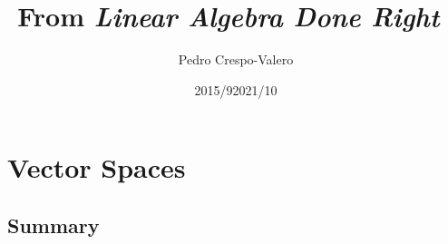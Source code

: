 \documentclass[11pt,notitlepage,oneside]{article}
\author{Pedro Crespo-Valero}
\begin{document}
\title{From \emph{Linear Algebra Done Right}~\cite{Axler1997}}
\date{2015/9}
\date{2021/10}
\maketitle

\tableofcontents

\newpage
\setcounter{section}{0}

\section{Vector Spaces}
\subsection*{Summary}
\end{document}
